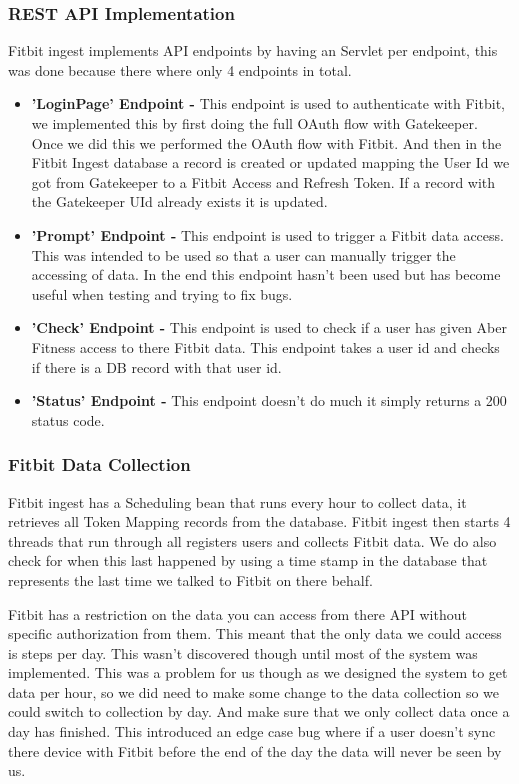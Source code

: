 \subsubsection{REST API Implementation}

\par
Fitbit ingest implements API endpoints by having an Servlet per endpoint, this was done because there where only 4 endpoints in total.

\begin{itemize}
	\item \textbf{'LoginPage' Endpoint -} This endpoint is used to authenticate with Fitbit, we implemented this by first doing the full OAuth flow with Gatekeeper. Once we did this we performed the OAuth flow with Fitbit. And then in the Fitbit Ingest database a record is created or updated mapping the User Id we got from Gatekeeper to a Fitbit Access and Refresh Token. If a record with the Gatekeeper UId already exists it is updated.
	\item \textbf{'Prompt' Endpoint -} This endpoint is used to trigger a Fitbit data access. This was intended to be used so that a user can manually trigger the accessing of data. In the end this endpoint hasn't been used but has become useful when testing and trying to fix bugs.
	\item \textbf{'Check' Endpoint -} This endpoint is used to check if a user has given Aber Fitness access to there Fitbit data. This endpoint takes a user id and checks if there is a DB record with that user id.
	\item \textbf{'Status' Endpoint -} This endpoint doesn't do much it simply returns a 200 status code.
\end{itemize}

\subsubsection{Fitbit Data Collection}

\par
Fitbit ingest has a Scheduling bean that runs every hour to collect data, it retrieves all Token Mapping records from the database. Fitbit ingest then starts 4 threads that run through all registers users and collects Fitbit data. We do also check for when this last happened by using a time stamp in the database that represents the last time we talked to Fitbit on there behalf.

\par
Fitbit has a restriction on the data you can access from there API without specific authorization from them. This meant that the only data we could access is steps per day. This wasn't discovered though until most of the system was implemented. This was a problem for us though as we designed the system to get data per hour, so we did need to make some change to the data collection so we could switch to collection by day. And make sure that we only collect data once a day has finished. This introduced an edge case bug where if a user doesn't sync there device with Fitbit before the end of the day the data will never be seen by us.

